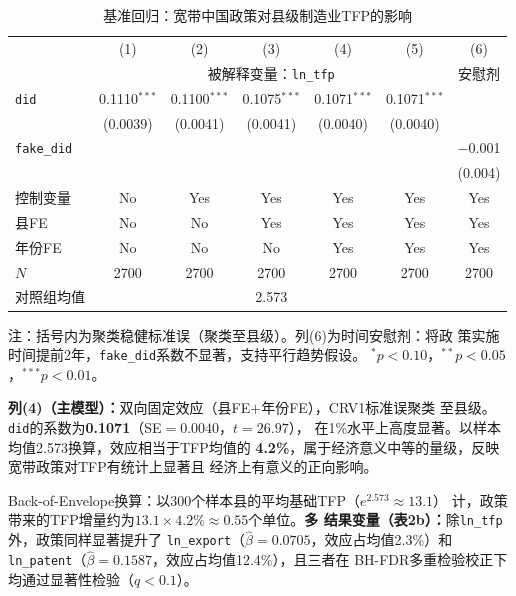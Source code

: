 \documentclass[12pt, a4paper]{article}
\begin{document}
\begin{table}[htbp]
\centering
\caption{基准回归：宽带中国政策对县级制造业TFP的影响}
\label{tab:baseline}
\begin{threeparttable}
\setlength{\tabcolsep}{6pt}
\begin{tabular}{lcccccc}
\toprule
& (1) & (2) & (3) & (4) & (5) & (6) \\
& \multicolumn{5}{c}{被解释变量：\texttt{ln\_tfp}} & 安慰剂 \\
\midrule
\texttt{did} & 0.1110$^{***}$ & 0.1100$^{***}$ & 0.1075$^{***}$ & 0.1071$^{***}$ & 0.1071$^{***}$ & \\
 & (0.0039) & (0.0041) & (0.0041) & (0.0040) & (0.0040) & \\
\texttt{fake\_did} & & & & & & $-$0.001 \\
 & & & & & & (0.004) \\
\midrule
控制变量 & No & Yes & Yes & Yes & Yes & Yes \\
县FE & No & No & Yes & Yes & Yes & Yes \\
年份FE & No & No & No & Yes & Yes & Yes \\
\midrule
$N$ & 2700 & 2700 & 2700 & 2700 & 2700 & 2700 \\
对照组均值 & \multicolumn{5}{c}{2.573} & \\
\bottomrule
\end{tabular}
\begin{tablenotes}\small
\item 注：括号内为聚类稳健标准误（聚类至县级）。列(6)为时间安慰剂：将政
  策实施时间提前2年，\texttt{fake\_did}系数不显著，支持平行趋势假设。
  $^{*}p<0.10$，$^{**}p<0.05$，$^{***}p<0.01$。
\end{tablenotes}
\end{threeparttable}
\end{table}

\textbf{列(4)（主模型）：}双向固定效应（县FE$+$年份FE），CRV1标准误聚类
至县级。\texttt{did}的系数为\textbf{0.1071}（SE$=0.0040$，$t=26.97$），
在1\%水平上高度显著。以样本均值2.573换算，效应相当于TFP均值的
\textbf{4.2\%}，属于经济意义中等的量级，反映宽带政策对TFP有统计上显著且
经济上有意义的正向影响。

Back-of-Envelope换算：以300个样本县的平均基础TFP（$e^{2.573}\approx13.1$）
计，政策带来的TFP增量约为$13.1\times4.2\%\approx0.55$个单位。\textbf{多
结果变量（表2b）：}除\texttt{ln\_tfp}外，政策同样显著提升了
\texttt{ln\_export}（$\hat\beta=0.0705$，效应占均值2.3\%）和
\texttt{ln\_patent}（$\hat\beta=0.1587$，效应占均值12.4\%），且三者在
BH-FDR多重检验校正下均通过显著性检验（$q<0.1$）。
\end{document}
